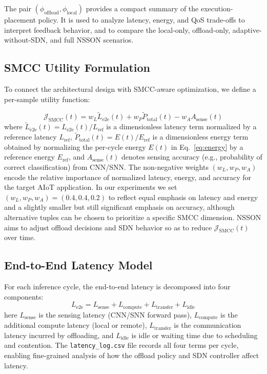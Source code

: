 \documentclass[journal]{IEEEtran}
\newcommand{\revblue}[1]{\textcolor{revblue}{#1}}
\begin{document}
The pair $(\phi_{\text{offload}},\phi_{\text{local}})$ provides a compact
summary of the execution-placement policy. It is used to analyze
latency, energy, and QoS trade-offs to interpret feedback behavior, and to
compare the local-only, offload-only, adaptive-without-SDN, and full NSSON scenarios.

\subsection{SMCC Utility Formulation}

To connect the architectural design with SMCC-aware optimization, we define a per-sample utility function:

\begin{equation}
\mathcal{J}_{\mathrm{SMCC}}(t)
= w_L \tilde{L}_{\text{e2e}}(t)
+ w_P \tilde{P}_{\text{total}}(t)
- w_A A_{\text{sense}}(t)
\label{eq:smcc_utility}
\end{equation}
\revblue{
where $\tilde{L}_{\text{e2e}}(t) = L_{\text{e2e}}(t)/L_{\text{ref}}$ is a
dimensionless latency term normalized by a reference latency
$L_{\text{ref}}$, $\tilde{P}_{\text{total}}(t) = E(t)/E_{\text{ref}}$ is a
dimensionless energy term obtained by normalizing the per-cycle energy
$E(t)$ in Eq.~\eqref{eq:energy} by a reference energy $E_{\text{ref}}$, and
$A_{\text{sense}}(t)$ denotes sensing accuracy (e.g., probability of
correct classification) from CNN/SNN. The non-negative weights
$(w_L,w_P,w_A)$ encode the relative importance of normalized latency,
energy, and accuracy for the target AIoT application. In our experiments
we set $(w_L,w_P,w_A)=(0.4,0.4,0.2)$ to reflect equal emphasis on
latency and energy and a slightly smaller but still significant emphasis
on accuracy, although alternative tuples can be chosen to prioritize a
specific SMCC dimension. NSSON aims to adjust offload decisions and SDN
behavior so as to reduce $\mathcal{J}_{\mathrm{SMCC}}(t)$ over time.}

\subsection{End-to-End Latency Model}
\label{sec:latency_model}

For each inference cycle, the end-to-end latency is decomposed into four components:
\begin{equation}
L_{\text{e2e}} = L_{\text{sense}} + L_{\text{compute}} +
                 L_{\text{transfer}} + L_{\text{idle}}
\label{eq:latency}
\end{equation}
here $L_{\text{sense}}$ is the sensing latency (CNN/SNN forward pass), $L_{\text{compute}}$ is the additional compute latency (local or remote), $L_{\text{transfer}}$ is the communication latency incurred by offloading, and $L_{\text{idle}}$ is idle or waiting time due to scheduling and contention. The \texttt{latency\_log.csv} file records all four terms per cycle, enabling fine-grained analysis of how the offload policy and SDN controller affect latency.
\end{document}
